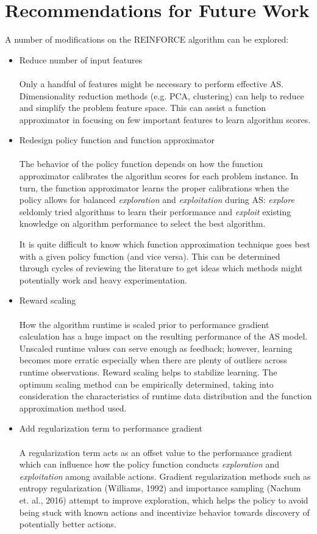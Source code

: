 \section{Recommendations for Future Work}
A number of modifications on the REINFORCE algorithm can be explored:

\begin{itemize}
	\item Reduce number of input features \\ \\
	Only a handful of features might be necessary to perform effective AS. Dimensionality reduction methods (e.g. PCA, clustering) can help to reduce and simplify the problem feature space. This can assist a function approximator in focusing on few important features to learn algorithm scores.
	
	\item Redesign policy function and function approximator \\ \\
	The behavior of the policy function depends on how the function approximator calibrates the algorithm scores for each problem instance. In turn, the function approximator learns the proper calibrations when the policy allows for balanced \textit{exploration} and \textit{exploitation} during AS: \textit{explore} seldomly tried algorithms to learn their performance and \textit{exploit} existing knowledge on algorithm performance to select the best algorithm.
	
	It is quite difficult to know which function approximation technique goes best with a given policy function (and vice versa). This can be determined through cycles of reviewing the literature to get ideas which methods might potentially work and heavy experimentation. 
	
	\item Reward scaling \\ \\
	How the algorithm runtime is scaled prior to performance gradient calculation has a huge impact on the resulting performance of the AS model. Unscaled runtime values can serve enough as feedback; however, learning becomes more erratic especially when there are plenty of outliers across runtime observations. Reward scaling helps to stabilize learning. The optimum scaling method can be empirically determined, taking into consideration the characteristics of runtime data distribution and the function approximation method used.  
	
	\item Add regularization term to performance gradient \\ \\
	A regularization term acts as an offset value to the performance gradient which can influence how the policy function conducts \textit{exploration} and \textit{exploitation} among available actions. Gradient regularization methods such as entropy regularization (Williams, 1992) and importance sampling (Nachum et. al., 2016) attempt to improve exploration, which helps the policy to avoid being stuck with known actions and incentivize behavior towards discovery of potentially better actions. 
	

\end{itemize}
